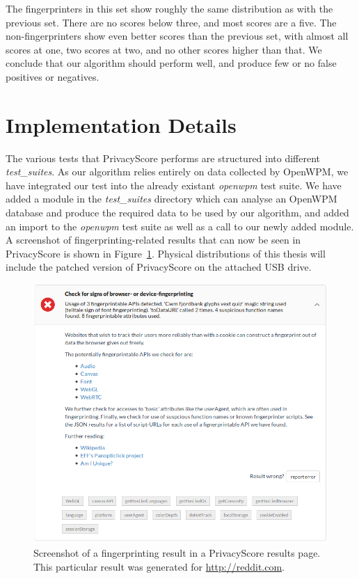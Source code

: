 \documentclass[
    fontsize=12pt,
    headings=small,
    parskip=half,
    bibliography=totoc,
    numbers=noenddot,
    open=any
    ]{scrreprt}
\begin{document}
The fingerprinters in this set show roughly the same distribution as with the previous set. There are no
scores below three, and most scores are a five. The non-fingerprinters show even better scores than
the previous set, with almost all scores at one, two scores at two, and no other scores higher
than that. We conclude that our algorithm should perform well, and produce few or no
false positives or negatives.


\section{Implementation Details}
The various tests that PrivacyScore performs are structured into different \textit{test\_suites}.
As our algorithm relies entirely on data collected by OpenWPM, we have integrated our test
into the already existant \textit{openwpm} test suite. We have added a module in the \textit{test\_suites}
directory which can analyse an OpenWPM database and produce the required data to be used
by our algorithm, and added an import to the \textit{openwpm} test suite as well as a call to our newly
added module. A screenshot of fingerprinting-related results that can now be seen in PrivacyScore
is shown in Figure~\ref{image:privacyscore}.
Physical distributions of this thesis will include the patched version of PrivacyScore
on the attached USB drive.

\begin{figure}
\centering
\includegraphics[scale=0.5]{images/privacyscore.png}
\caption{Screenshot of a fingerprinting result in a PrivacyScore results page. This particular result was generated for \url{http://reddit.com}.}
\label{image:privacyscore}
\end{figure}
\end{document}
